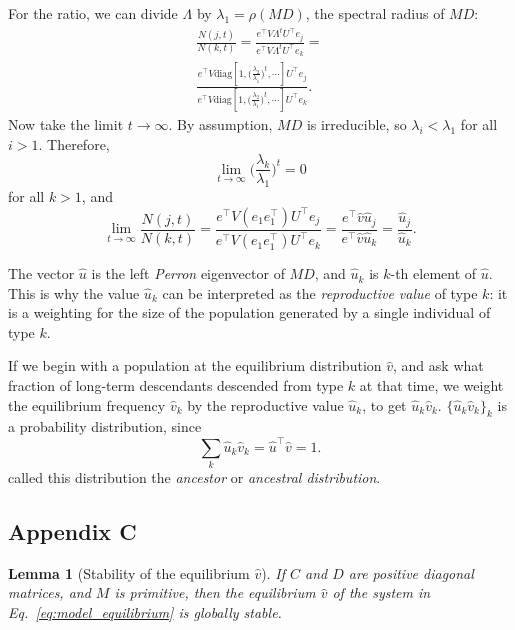 \documentclass[9pt, a4paper, twocolumn]{extarticle}
\newcommand*{\tr}{^\intercal}
\newcommand{\matrx}[1]{{\left[ \stackrel{}{#1}\right]}}
\newcommand{\diag}[1]{\mbox{diag}\matrx{#1}}
\newcommand{\goesto}{\rightarrow}
\newtheorem{lemma}{Lemma}
\begin{document}
For the ratio, we can divide $\Lambda$ by $\lambda_1 = \rho(MD)$,
the spectral radius of $MD$:
\begin{multline}
\frac{N(j,t)}{N(k,t)} =
\frac{ e\tr V \Lambda^t U\tr e_j}{ e\tr V \Lambda^t U\tr e_k} = \\
\frac{ e\tr V \diag{1, \Big(\frac{\lambda_2}{\lambda_1}\Big)^t, \cdots} U\tr e_j} { e\tr V \diag{1,\Big(\frac{\lambda_2}{\lambda_1}\Big)^t, \cdots} U\tr e_k}.
\end{multline}
Now take the limit $t \goesto \infty$.
By assumption, $MD$ is irreducible, so $\lambda_i < \lambda_1$ for all $i > 1$.
Therefore,
\begin{equation}
\lim_{t \goesto \infty} \Big( \frac{\lambda_k}{\lambda_1} \Big)^t = 0
\end{equation}
for all $k > 1$, and
\begin{equation}
\lim_{t \goesto \infty}\frac{N(j,t)}{N(k,t)} =
\frac{e\tr V (e_1 e_1\tr) U\tr e_j} { e\tr V (e_1 e_1\tr) U\tr e_k} = 
\frac{ e\tr \hat v \hat u_j} { e\tr \hat v  \hat u_k} =
\frac{\hat u_j} {\hat u_k}.
\end{equation}

The vector $\hat u$ is the left \emph{Perron} eigenvector of $MD$, and $\hat u_k$ is $k$-th element of $\hat u$.
This is why the value $\hat u_k$ can be interpreted as the \emph{reproductive value} of type $k$: it is a weighting for the size of the population generated by a single individual of type $k$.

If we begin with a population at the equilibrium distribution $\hat v$,
and ask what fraction of long-term descendants descended from type $k$ at that time,
we weight the equilibrium frequency $\hat v_k$ by the reproductive value $\hat u_k$, to get $\hat u_k \hat v_k$.
$\{\hat u_k \hat v_k\}_{k}$ is a probability distribution, since
\begin{equation}
\sum_k {\hat u_k \hat v_k} = \hat u\tr \hat v = 1.
\end{equation}
\citet{Hermisson2002} called this distribution the \emph{ancestor} or \emph{ancestral distribution}.

\subsection*{Appendix C}\label{sec:AppC}

\begin{lemma}[Stability of the equilibrium $\hat v$]
If $C$ and $D$ are positive diagonal matrices, and $M$ is primitive, 
then the equilibrium $\hat v$ of the system in Eq.~\ref{eq:model_equilibrium} is globally stable.
\end{lemma}
\end{document}
